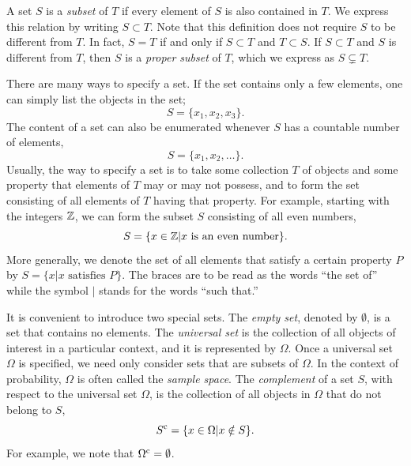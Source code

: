 A set $S$ is a \emph{subset} of $T$ if every element of $S$ is also contained in $T$.
We express this relation by writing $S \subset T$.
Note that this definition does not require $S$ to be different from $T$.
In fact, $S = T$ if and only if $S \subset T$ and $T \subset S$.
If $S \subset T$ and $S$ is different from $T$, then $S$ is a \emph{proper subset} of $T$, which we express as $S \subsetneq T$.

There are many ways to specify a set.
If the set contains only a few elements, one can simply list the objects in the set;
\begin{equation*}
S = \{ x_1, x_2, x_3 \} .
\end{equation*}
The content of a set can also be enumerated whenever $S$ has a countable number of elements,
\begin{equation*}
S = \{ x_1, x_2, \ldots \} .
\end{equation*}
Usually, the way to specify a set is to take some collection $T$ of objects and some property that elements of $T$ may or may not possess, and to form the set consisting of all elements of $T$ having that property.
For example, starting with the integers $\mathbb{Z}$, we can form the subset $S$ consisting of all even numbers,
\begin{equation*}
S = \{ x \in \mathbb{Z} | x \text{ is an even number} \}.
\end{equation*}
More generally, we denote the set of all elements that satisfy a certain property $P$ by $S = \{ x | x \text{ satisfies } P \}$.
The braces are to be read as the words ``the set of'' while the symbol $|$ stands for the words ``such that.''

It is convenient to introduce two special sets.
The \emph{empty set}, denoted by $\emptyset$, is a set that contains no elements.
The \emph{universal set} is the collection of all objects of interest in a particular context, and it is represented by $\Omega$.
Once a universal set $\Omega$ is specified, we need only consider sets that are subsets of $\Omega$.
In the context of probability, $\Omega$ is often called the \emph{sample space}.
The \emph{complement} of a set $S$, with respect to the universal set $\Omega$, is the collection of all objects in $\Omega$ that do not belong to $S$,
\begin{equation*}
S^{\mathrm{c}} = \{ x \in \Omega | x \notin S \}.
\end{equation*}
For example, we note that $\Omega^{\mathrm{c}} = \emptyset$.


